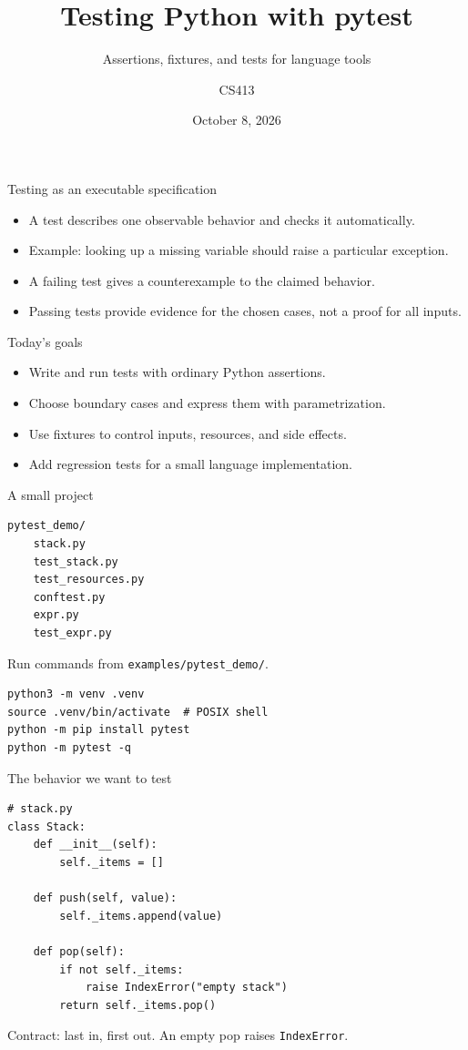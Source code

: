 \documentclass[aspectratio=169,11pt]{beamer}
\title{Testing Python with pytest}
\subtitle{Assertions, fixtures, and tests for language tools}
\author{CS413}
\date{October 8, 2026}
\newcommand{\code}[1]{\texttt{#1}}
\begin{document}
\begin{frame}\titlepage\end{frame}
\begin{frame}[fragile]{Testing as an executable specification}
\begin{itemize}
\item A test describes one observable behavior and checks it automatically.
\item Example: looking up a missing variable should raise a particular exception.
\item A failing test gives a counterexample to the claimed behavior.
\item Passing tests provide evidence for the chosen cases, not a proof for all inputs.
\end{itemize}
\end{frame}

\begin{frame}[fragile]{Today's goals}
\begin{itemize}
\item Write and run tests with ordinary Python assertions.
\item Choose boundary cases and express them with parametrization.
\item Use fixtures to control inputs, resources, and side effects.
\item Add regression tests for a small language implementation.
\end{itemize}
\end{frame}

\begin{frame}[fragile]{A small project}
\begin{lstlisting}
pytest_demo/
    stack.py
    test_stack.py
    test_resources.py
    conftest.py
    expr.py
    test_expr.py
\end{lstlisting}
Run commands from \code{examples/pytest\_demo/}.
\begin{lstlisting}
python3 -m venv .venv
source .venv/bin/activate  # POSIX shell
python -m pip install pytest
python -m pytest -q
\end{lstlisting}

\end{frame}

\begin{frame}[fragile]{The behavior we want to test}
\begin{lstlisting}
# stack.py
class Stack:
    def __init__(self):
        self._items = []

    def push(self, value):
        self._items.append(value)

    def pop(self):
        if not self._items:
            raise IndexError("empty stack")
        return self._items.pop()
\end{lstlisting}
Contract: last in, first out. An empty pop raises \code{IndexError}.
\end{frame}
\end{document}
